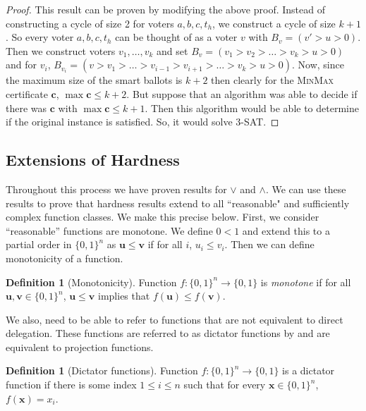 \documentclass[11pt,a4paper, titlepage]{article}
\theoremstyle{definition}
\newtheorem{definition}[theorem]{Definition}
\let\vec\mathbf
\begin{document}
\begin{proof}
    This result can be proven by modifying the above proof. Instead of constructing a cycle of size 2 for voters $a, b, c, t_h$, we construct a cycle of size $k + 1$. So every voter $a, b, c, t_h$ can be thought of as a voter $v$ with $B_v = (v' > u > 0)$. Then we construct voters $v_1, \ldots, v_k$ and set $B_v = (v_1 > v_2 > \ldots > v_k > u > 0)$ and for $v_i$, $B_{v_i} = (v > v_1 > \ldots > v_{i - 1} > v_{i+1} > \ldots > v_k > u > 0)$.
    Now, since the maximum size of the smart ballots is $k + 2$ then clearly for the \textsc{MinMax} certificate $\vec{c}$, $\max{\vec{c}} \leq k + 2$. 
    But suppose that an algorithm was able to decide if there was $\vec{c}$ with $\max{\vec{c}} \leq k + 1$. Then this algorithm would be able to determine if the original instance is satisfied. So, it would solve \textsc{3-SAT}.
\end{proof}

\subsection{Extensions of Hardness}

Throughout this process we have proven results for $\lor$ and $\land$.
We can use these results to prove that hardness results extend to all ``reasonable" and sufficiently complex function classes.
We make this precise below.
First, we consider ``reasonable'' functions are monotone. 
We define $0 < 1$ and extend this to a partial order in $\{0,1\}^n$ as $\vec{u} \leq \vec{v}$ if for all $i$, $u_i \leq v_i$.
Then we can define monotonicity of a function.

\begin{definition}[Monotonicity]
    \label{monotonicity}
    Function $f\colon \{0, 1\}^n \longrightarrow \{0, 1\}$ is \emph{monotone} if for all $\vec{u}, \vec{v} \in \{0,1\}^n$, $\vec{u} \leq \vec{v}$ implies that $f(\vec{u}) \leq f(\vec{v})$.
\end{definition}

We also, need to be able to refer to functions that are not equivalent to direct delegation. 
These functions are referred to as dictator functions by \cite{boolean} and are equivalent to projection functions.

\begin{definition}[Dictator functions]
    Function $f \colon \{0, 1\}^n \longrightarrow \{0, 1\}$ is a dictator function if there is some index $1 \leq i \leq n$ such that for every $\vec{x} \in \{0, 1\}^n$, $f(\vec{x}) = x_i$.
\end{definition}
\end{document}
